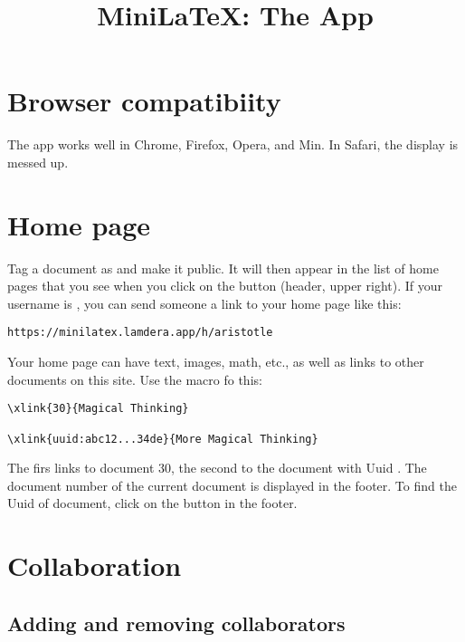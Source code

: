 \title{MiniLaTeX: The App}

\maketitle

\tableofcontents


\section{Browser compatibiity}

The app works well in Chrome, Firefox, Opera, and Min.   In Safari, the display is messed up.

\section{Home page}

Tag a document as   and make it public.  It will then appear in the list of home pages that you see when you click on the button  (header, upper right).  If your username is , you can send someone a link to your home page like this:

\begin{verbatim}
https://minilatex.lamdera.app/h/aristotle
\end{verbatim}

Your home page can have text, images, math, etc., as well as links to other documents on this site.  Use the  macro fo this:

\begin{verbatim}
\xlink{30}{Magical Thinking}

\xlink{uuid:abc12...34de}{More Magical Thinking}
\end{verbatim}

The firs links to document 30, the second to the document with Uuid .  The document number of the current document is displayed in the footer.  To find the Uuid of  document, click on the button  in the footer. 

\section{Collaboration}

\subsection{Adding and removing collaborators}


